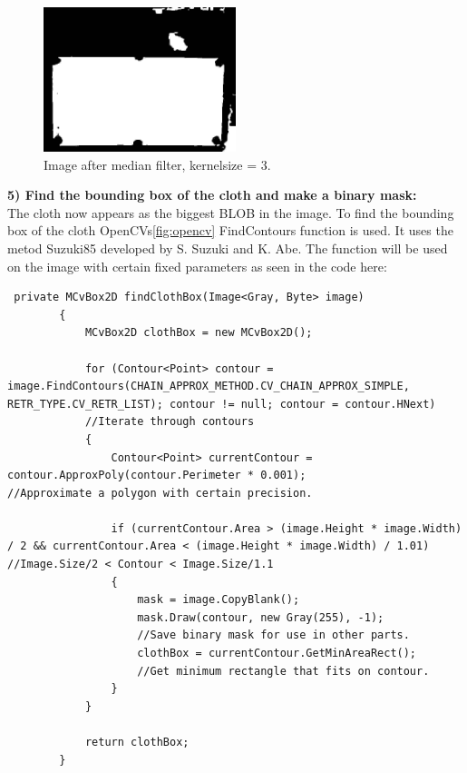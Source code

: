 \begin{figure}[H]
\begin{center}
\leavevmode
\includegraphics[width=0.5\textwidth]{images/afterclothmedian}
\end{center}
\caption{Image after median filter, kernelsize = 3.}
\label{fig:afterclothmedian}
\end{figure}

\textbf{5) Find the bounding box of the cloth and make a binary mask:}\\
The cloth now appears as the biggest BLOB in the image. To find the bounding box of the cloth OpenCVs\ref{fig:opencv} FindContours function is used. It uses the metod Suzuki85 developed by S. Suzuki and K. Abe\cite{contour}. The function will be used on the image with certain fixed parameters as seen in the code here:

\begin{lstlisting}
 private MCvBox2D findClothBox(Image<Gray, Byte> image)
        {
            MCvBox2D clothBox = new MCvBox2D();

            for (Contour<Point> contour = image.FindContours(CHAIN_APPROX_METHOD.CV_CHAIN_APPROX_SIMPLE, RETR_TYPE.CV_RETR_LIST); contour != null; contour = contour.HNext)  
            //Iterate through contours
            {
                Contour<Point> currentContour = contour.ApproxPoly(contour.Perimeter * 0.001);                                           //Approximate a polygon with certain precision.

                if (currentContour.Area > (image.Height * image.Width) / 2 && currentContour.Area < (image.Height * image.Width) / 1.01)  //Image.Size/2 < Contour < Image.Size/1.1
                {
                    mask = image.CopyBlank();
                    mask.Draw(contour, new Gray(255), -1);
                    //Save binary mask for use in other parts.
                    clothBox = currentContour.GetMinAreaRect();                                                                          
                    //Get minimum rectangle that fits on contour.
                }
            }

            return clothBox;
        }
\end{lstlisting}

